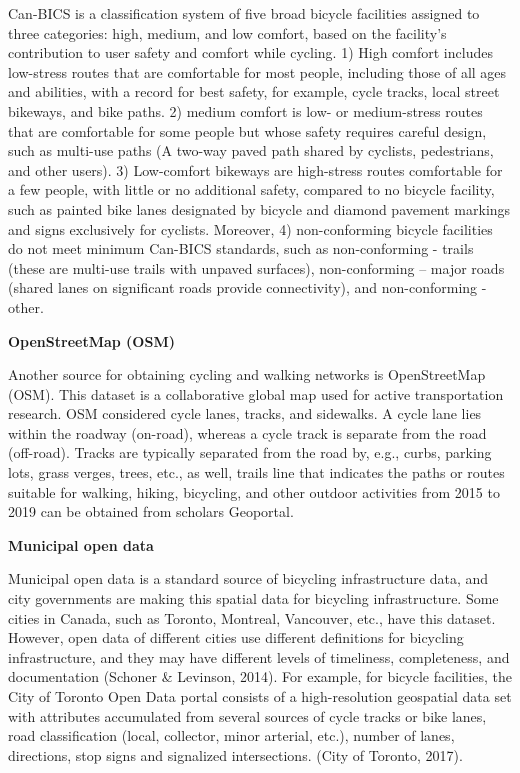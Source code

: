 \documentclass[
11pt, %
oneside, %
english, %
singlespacing, %
]{macthesis} %
\begin{document}
Can-BICS is a classification system of five broad bicycle facilities assigned to three categories: high, medium, and low comfort, based on the facility's contribution to user safety and comfort while cycling. 1) High comfort includes low-stress routes that are comfortable for most people, including those of all ages and abilities, with a record for best safety, for example, cycle tracks, local street bikeways, and bike paths. 2) medium comfort is low- or medium-stress routes that are comfortable for some people but whose safety requires careful design, such as multi-use paths (A two-way paved path shared by cyclists, pedestrians, and other users). 3) Low-comfort bikeways are high-stress routes comfortable for a few people, with little or no additional safety, compared to no bicycle facility, such as painted bike lanes designated by bicycle and diamond pavement markings and signs exclusively for cyclists. Moreover, 4) non-conforming bicycle facilities do not meet minimum Can-BICS standards, such as non-conforming - trails (these are multi-use trails with unpaved surfaces), non-conforming -- major roads (shared lanes on significant roads provide connectivity), and non-conforming - other.

\textbf{OpenStreetMap (OSM)}

Another source for obtaining cycling and walking networks is OpenStreetMap (OSM). This dataset is a collaborative global map used for active transportation research. OSM considered cycle lanes, tracks, and sidewalks. A cycle lane lies within the roadway (on-road), whereas a cycle track is separate from the road (off-road). Tracks are typically separated from the road by, e.g., curbs, parking lots, grass verges, trees, etc., as well, trails line that indicates the paths or routes suitable for walking, hiking, bicycling, and other outdoor activities from 2015 to 2019 can be obtained from scholars Geoportal.

\textbf{Municipal open data}

Municipal open data is a standard source of bicycling infrastructure data, and city governments are making this spatial data for bicycling infrastructure. Some cities in Canada, such as Toronto, Montreal, Vancouver, etc., have this dataset. However, open data of different cities use different definitions for bicycling infrastructure, and they may have different levels of timeliness, completeness, and documentation (Schoner \& Levinson, 2014). For example, for bicycle facilities, the City of Toronto Open Data portal consists of a high-resolution geospatial data set with attributes accumulated from several sources of cycle tracks or bike lanes, road classification (local, collector, minor arterial, etc.), number of lanes, directions, stop signs and signalized intersections. (City of Toronto, 2017).
\end{document}
